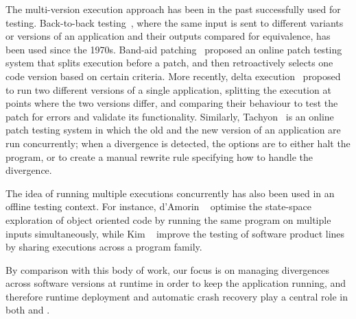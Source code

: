 
The multi-version execution approach has been in the past successfully used for
testing. Back-to-back testing~\cite{back-to-back90}, where the same input is
sent to different variants or versions of an application and their outputs
compared for equivalence, has been used since the 1970s.  Band-aid
patching~\cite{bandaid-patch07} proposed an online patch testing system that
splits execution before a patch, and then retroactively selects one code
version based on certain criteria.  More recently, delta
execution~\cite{onlinevalidation} proposed to run two different versions of a
single application, splitting the execution at points where the two versions
differ, and comparing their behaviour to test the patch for errors and validate
its functionality.  Similarly, Tachyon~\cite{tachyon12} is an online patch
testing system
in which the old and the new version of an application are run concurrently;
when a divergence is detected, the options are to either halt the program, or
to create a manual rewrite rule specifying how to handle the divergence.

The idea of running multiple executions concurrently has also been used in an
offline testing context.  For instance, d'Amorin \etal~\cite{delta-exec-oop}
optimise the state-space exploration of object oriented code by running the
same program on multiple inputs simultaneously, while Kim
\etal~\cite{shared-exec12} improve the testing of software product lines by
sharing executions across a program family.

By comparison with this body of work, our focus is on managing
divergences across software versions at runtime in order to keep the
application running, and therefore runtime deployment and automatic
crash recovery play a central role in both \mx and \varan.
